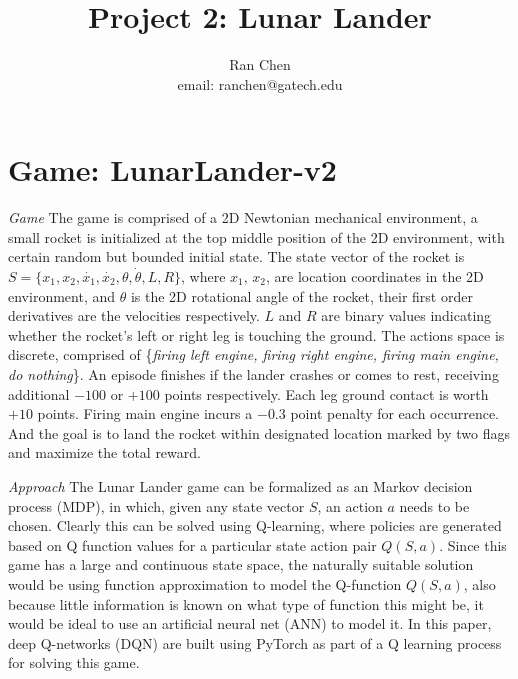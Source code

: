 \documentclass[10pt]{article}
\author{Ran Chen \\ email: ranchen@gatech.edu\vspace{-2ex}}
\title{\vspace{-1.8cm}Project 2: Lunar Lander}
\date{}
\begin{document}
\maketitle
\thispagestyle{fancy}


\section{Game: LunarLander-v2} \label{game}

\textit{Game} The game is comprised of a 2D Newtonian mechanical environment, a small rocket is initialized at the top middle position of the 2D environment, with certain random but bounded initial state. The state vector of the rocket is $S=\{x_1, x_2, \dot{x_1}, \dot{x_2}, \theta, \dot{\theta}, L, R\}$, where $x_1$, $x_2$, are location coordinates in the 2D environment, and $\theta$ is the 2D rotational angle of the rocket, their first order derivatives are the velocities respectively. $L$ and $R$ are binary values indicating whether the rocket's left or right leg is touching the ground. The actions space is discrete, comprised of \{\textit{firing left engine, firing right engine, firing main engine, do nothing}\}. An episode finishes if the lander crashes or comes to rest, receiving additional $-100$ or $+100$ points respectively. Each leg ground contact is worth $+10$ points. Firing main engine incurs a $-0.3$ point penalty for each occurrence. And the goal is to land the rocket within designated location marked by two flags and maximize the total reward.\par
\bigbreak
\noindent
\textit{Approach} The Lunar Lander game can be formalized as an Markov decision process (MDP), in which, given any state vector $S$, an action $a$ needs to be chosen. Clearly this can be solved using Q-learning, where policies are generated based on Q function values for a particular state action pair $Q(S,a)$. Since this game has a large and continuous state space, the naturally suitable solution would be using function approximation to model the Q-function $Q(S,a)$, also because little information is known on what type of function this might be, it would be ideal to use an artificial neural net (ANN) to model it. In this paper, deep Q-networks (DQN)\cite{MnihPlayingAtariDeep2013, RoderickImplementingDeepQNetwork2017} are built using PyTorch as part of a Q learning process for solving this game. 
\end{document}
